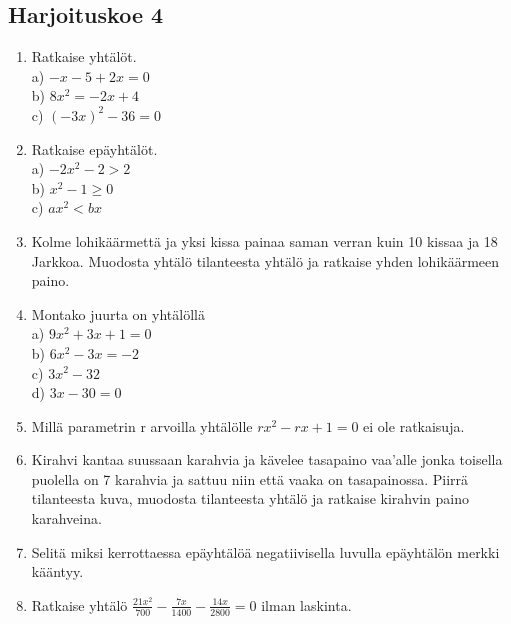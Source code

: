 \subsection*{Harjoituskoe 4}
\begin{enumerate}
\item Ratkaise yhtälöt.\\ a) $-x-5+2x=0$\\ b) $8x^2=-2x+4$\\ c) $(-3x)^2-36=0$
\item Ratkaise epäyhtälöt.\\ a) $-2x^2-2>2$\\ b) $x^2-1\geq0$\\ c) $ax^2<bx$
\item Kolme lohikäärmettä ja yksi kissa painaa saman verran kuin 10 kissaa ja 18 Jarkkoa. Muodosta yhtälö tilanteesta yhtälö ja ratkaise yhden lohikäärmeen paino.
\item Montako juurta on yhtälöllä\\ a) $9x^2+3x+1=0$\\ b) $6x^2-3x=-2$\\ c) $3x^2-32$\\ d) $3x-30=0$
\item Millä parametrin r arvoilla yhtälölle $rx^2-rx+1=0$ ei ole ratkaisuja.
\item Kirahvi kantaa suussaan karahvia ja kävelee tasapaino vaa'alle jonka toisella puolella on 7 karahvia ja sattuu niin että vaaka on tasapainossa. Piirrä tilanteesta kuva, muodosta tilanteesta yhtälö ja ratkaise kirahvin paino karahveina.
\item Selitä miksi kerrottaessa epäyhtälöä negatiivisella luvulla epäyhtälön merkki kääntyy.
\item Ratkaise yhtälö $\frac{21x^2}{700}-\frac{7x}{1400}-\frac{14x}{2800}=0$ ilman laskinta.
\end{enumerate}
